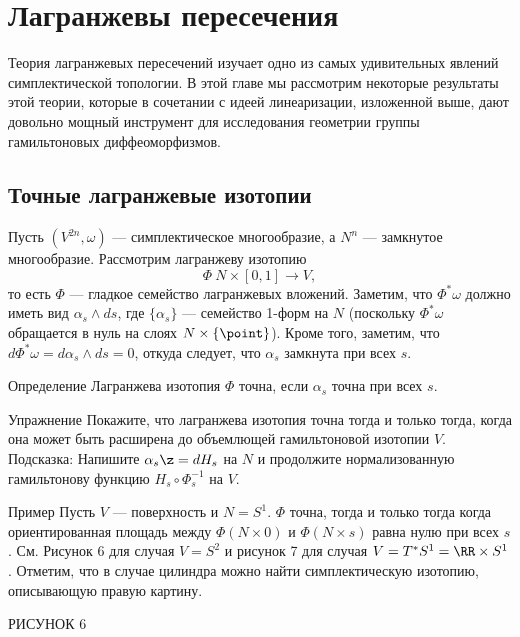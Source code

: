 \chapter{Лагранжевы пересечения}

Теория лагранжевых пересечений изучает одно из самых удивительных явлений симплектической топологии.
В этой главе мы рассмотрим некоторые результаты этой теории, которые в сочетании с идеей линеаризации, изложенной выше, дают довольно мощный инструмент для исследования геометрии группы гамильтоновых диффеоморфизмов.

\section{Точные лагранжевые изотопии}
Пусть $(V^{2n}, \omega)$ --- симплектическое многообразие, а $N^n$ --- замкнутое многообразие.
Рассмотрим лагранжеву изотопию
\[\Phi\: N \times [0, 1] \to V,\]
то есть $\Phi$ --- гладкое семейство лагранжевых вложений.
Заметим, что $\Phi^\ast \omega$ должно иметь вид $\alpha_s \wedge ds$, где $\{\alpha_s\}$ --- семейство 1-форм на $N$ (поскольку $\Phi^\ast \omega$ обращается в нуль на слоях $N \times \{\point\}$).
Кроме того, заметим, что $d\Phi^\ast \omega = d\alpha_s \wedge ds = 0$, откуда следует, что $\alpha_s$ замкнута при всех $s$.

\begin{thm*}{Определение}
Лагранжева изотопия $\Phi$ точна, если $\alpha_s$ точна при всех $s$.
\end{thm*}

\begin{thm}{Упражнение}\label{6.1.A}
Покажите, что лагранжева изотопия точна тогда и только тогда, когда она может быть расширена до объемлющей гамильтоновой изотопии $V$.
Подсказка: Напишите $\alpha_s \z= dH_s$ на $N$ и продолжите нормализованную гамильтонову функцию $H_s \circ \Phi^{-1}_s$ на $V$.
\end{thm}

\begin{thm*}{Пример}
Пусть $V$ --- поверхность и $N = S^1$.
$\Phi$ точна, тогда и только тогда когда ориентированная площадь между $\Phi (N \times {0})$ и $\Phi (N \times {s})$ равна нулю при всех $s$.
См. Рисунок 6 для случая $V = S^2$ и рисунок 7 для случая $V = T^\ast S^1 = \RR \times S^1$.
Отметим, что в случае цилиндра можно найти симплектическую изотопию, описывающую правую картину.
\end{thm*}

РИСУНОК 6

